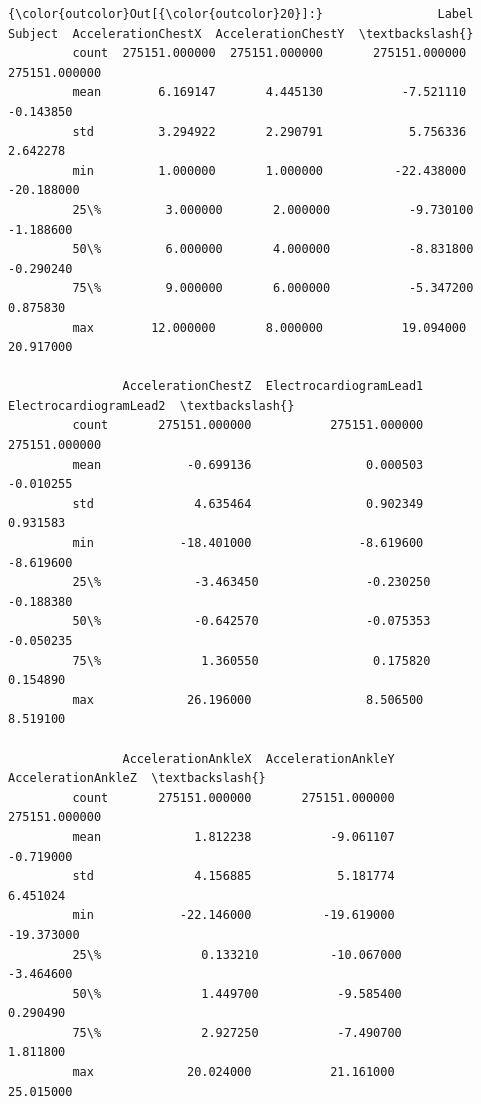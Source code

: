 \documentclass[11pt]{article}
\begin{document}
\begin{Verbatim}[commandchars=\\\{\}]
{\color{outcolor}Out[{\color{outcolor}20}]:}                Label        Subject  AccelerationChestX  AccelerationChestY  \textbackslash{}
         count  275151.000000  275151.000000       275151.000000       275151.000000   
         mean        6.169147       4.445130           -7.521110           -0.143850   
         std         3.294922       2.290791            5.756336            2.642278   
         min         1.000000       1.000000          -22.438000          -20.188000   
         25\%         3.000000       2.000000           -9.730100           -1.188600   
         50\%         6.000000       4.000000           -8.831800           -0.290240   
         75\%         9.000000       6.000000           -5.347200            0.875830   
         max        12.000000       8.000000           19.094000           20.917000   
         
                AccelerationChestZ  ElectrocardiogramLead1  ElectrocardiogramLead2  \textbackslash{}
         count       275151.000000           275151.000000           275151.000000   
         mean            -0.699136                0.000503               -0.010255   
         std              4.635464                0.902349                0.931583   
         min            -18.401000               -8.619600               -8.619600   
         25\%             -3.463450               -0.230250               -0.188380   
         50\%             -0.642570               -0.075353               -0.050235   
         75\%              1.360550                0.175820                0.154890   
         max             26.196000                8.506500                8.519100   
         
                AccelerationAnkleX  AccelerationAnkleY  AccelerationAnkleZ  \textbackslash{}
         count       275151.000000       275151.000000       275151.000000   
         mean             1.812238           -9.061107           -0.719000   
         std              4.156885            5.181774            6.451024   
         min            -22.146000          -19.619000          -19.373000   
         25\%              0.133210          -10.067000           -3.464600   
         50\%              1.449700           -9.585400            0.290490   
         75\%              2.927250           -7.490700            1.811800   
         max             20.024000           21.161000           25.015000   
         

\end{Verbatim}
\end{document}
